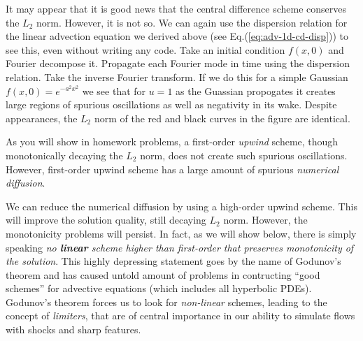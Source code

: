 \documentclass[12pt]{article}
\theoremstyle{definition}
\theoremstyle{definition}
\theoremstyle{definition}
\newcommand{\eqr}[1]{Eq.\thinspace(#1)}
\begin{document}
It may appear that it is good news that the central difference scheme
conserves the $L_2$ norm. However, it is not so. We can again use the
dispersion relation for the linear advection equation we derived above
(see \eqr{\ref{eq:adv-1d-cd-disp}}) to see this, even without writing
any code. Take an initial condition $f(x,0)$ and Fourier decompose
it. Propagate each Fourier mode in time using the dispersion
relation. Take the inverse Fourier transform. If we do this for a
simple Gaussian $f(x,0) = e^{-a^2 x^2}$ we see that for $u = 1$ as the
Guassian propogates it creates large regions of spurious oscillations
as well as negativity in its wake. Despite appearances, the $L_2$ norm
of the red and black curves in the figure are identical.

As you will show in homework problems, a first-order \emph{upwind}
scheme, though monotonically decaying the $L_2$ norm, does not create
such spurious oscillations. However, first-order upwind scheme has a
large amount of spurious \emph{numerical diffusion}. 

We can reduce the numerical diffusion by using a high-order upwind
scheme. This will improve the solution quality, still decaying $L_2$
norm. However, the monotonicity problems will persist. In fact, as we
will show below, there is simply speaking \emph{no {\bf linear} scheme
  higher than first-order that preserves monotonicity of the
  solution}. This highly depressing statement goes by the name of
Godunov's theorem and has caused untold amount of problems in
contructing ``good schemes'' for advective equations (which includes
all hyperbolic PDEs). Godunov's theorem forces us to look for
\emph{non-linear} schemes, leading to the concept of \emph{limiters},
that are of central importance in our ability to simulate flows with
shocks and sharp features.
\end{document}
